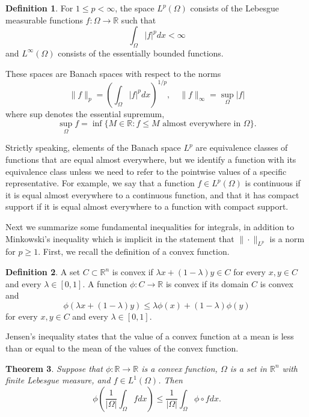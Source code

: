 \documentclass[10pt]{article}
\theoremstyle{plain}
\newtheorem{theorem}{Theorem}[section]
\theoremstyle{definition}
\newtheorem{definition}[theorem]{Definition}
\theoremstyle{remark}
\begin{document}
\begin{definition}
For $1 \leq p<\infty$, the space $L^{p}(\Omega)$ consists of the Lebesgue measurable functions $f: \Omega \rightarrow \mathbb{R}$ such that
$$
\int_{\Omega}|f|^{p} dx<\infty
$$
and $L^{\infty}(\Omega)$ consists of the essentially bounded functions.

These spaces are Banach spaces with respect to the norms
$$
\|f\|_{p}=\left(\int_{\Omega}|f|^{p} dx\right)^{1/p}, \quad\|f\|_{\infty}=\sup_{\Omega}|f|
$$
where sup denotes the essential supremum,
$$
\sup_{\Omega} f=\inf \{M \in \mathbb{R}: f \leq M \text{ almost everywhere in } \Omega\}.
$$
\end{definition}

Strictly speaking, elements of the Banach space $L^{p}$ are equivalence classes of functions that are equal almost everywhere, but we identify a function with its equivalence class unless we need to refer to the pointwise values of a specific representative. For example, we say that a function $f \in L^{p}(\Omega)$ is continuous if it is equal almost everywhere to a continuous function, and that it has compact support if it is equal almost everywhere to a function with compact support.

Next we summarize some fundamental inequalities for integrals, in addition to Minkowski's inequality which is implicit in the statement that $\|\cdot\|_{L^{p}}$ is a norm for $p \geq 1$. First, we recall the definition of a convex function.

\begin{definition}
A set $C \subset \mathbb{R}^{n}$ is convex if $\lambda x+(1-\lambda) y \in C$ for every $x, y \in C$ and every $\lambda \in[0,1]$. A function $\phi: C \rightarrow \mathbb{R}$ is convex if its domain $C$ is convex and
$$
\phi(\lambda x+(1-\lambda) y) \leq \lambda \phi(x)+(1-\lambda) \phi(y)
$$
for every $x, y \in C$ and every $\lambda \in[0,1]$.
\end{definition}

Jensen's inequality states that the value of a convex function at a mean is less than or equal to the mean of the values of the convex function.

\begin{theorem}
Suppose that $\phi: \mathbb{R} \rightarrow \mathbb{R}$ is a convex function, $\Omega$ is a set in $\mathbb{R}^{n}$ with finite Lebesgue measure, and $f \in L^{1}(\Omega)$. Then
$$
\phi\left(\frac{1}{|\Omega|} \int_{\Omega} f dx\right) \leq \frac{1}{|\Omega|} \int_{\Omega} \phi \circ f dx.
$$
\end{theorem}
\end{document}
